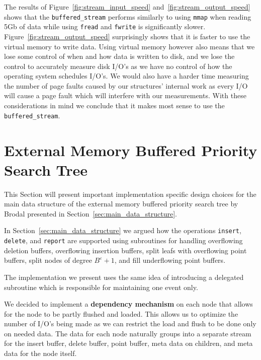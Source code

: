 \documentclass[twoside,11pt,openright]{report}
\def \epsilon {\varepsilon}
\begin{document}
The results of Figure~\ref{fig:stream_input_speed} and~\ref{fig:stream_output_speed} shows that the \texttt{buffered\_stream} performs similarly to using \texttt{mmap} when reading 5Gb of data while using \texttt{fread} and \texttt{fwrite} is significantly slower.
Figure~\ref{fig:stream_output_speed} surprisingly shows that it is faster to use the virtual memory to write data. Using virtual memory however also means that we lose some control of when and how data is written to disk, and we lose the control to accurately measure disk I/O's as we have no control of how the operating system schedules I/O's. We would also have a harder time measuring the number of page faults caused by our structures' internal work as every I/O will cause a page fault which will interfere with our measurements. With these considerations in mind we conclude that it makes most sense to use the \texttt{buffered\_stream}.

\section{External Memory Buffered Priority Search Tree}
\label{sec:impl_main_data_structure}
This Section will present important implementation specific design choices for the main data structure of the external memory buffered priority search tree by Brodal presented in Section~\ref{sec:main_data_structure}.

In Section~\ref{sec:main_data_structure} we argued how the operations \texttt{insert}, \texttt{delete}, and \texttt{report} are supported using subroutines for handling overflowing deletion buffers, overflowing insertion buffers, split leafs with overflowing point buffers, split nodes of degree $B^\epsilon+1$, and fill underflowing point buffers.

The implementation we present uses the same idea of introducing a delegated subroutine which is responsible for maintaining one event only.

We decided to implement a \textbf{dependency mechanism} on each node that allows for the node to be partly flushed and loaded. This allows us to optimize the number of I/O's being made as we can restrict the load and flush to be done only on needed data. The data for each node naturally groups into a separate stream for the insert buffer, delete buffer, point buffer, meta data on children, and meta data for the node itself.
\end{document}

